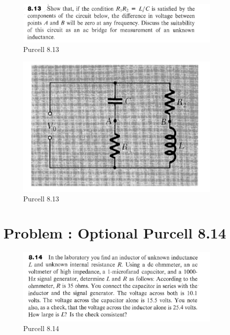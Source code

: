 \documentclass[problems]{esg8022pset}
\begin{document}
\begin{figure}[H]
    \centering
    \includegraphics[width = 10cm]{pu813}
    \caption{Purcell 8.13}
  \end{figure}

  \begin{figure}[H]
    \centering
    \includegraphics[width = 10cm]{figpu813}
    \caption{Purcell 8.13}
  \end{figure}

\section{Problem \thesection: Optional Purcell 8.14}
\begin{figure}[H]
    \centering
    \includegraphics[width = 10cm]{pu814}
    \caption{Purcell 8.14}
  \end{figure}
\end{document}
